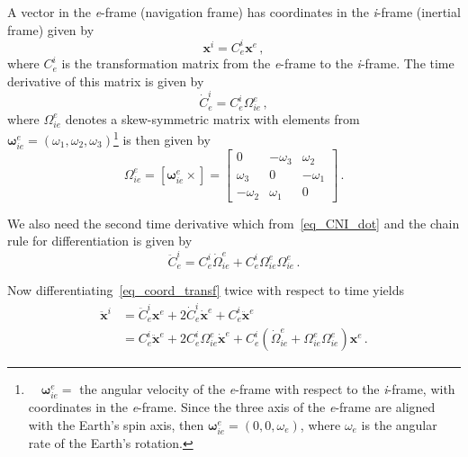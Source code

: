 \documentclass[journal]{IEEEtran}
\begin{document}
A vector in the \textit{e}-frame (navigation frame) has coordinates in the \textit{i}-frame (inertial frame) given by
\begin{equation}
    \boldsymbol{x}^i=C_{e}^{i}\boldsymbol{x}^e\,,
    \label{eq_coord_transf}
\end{equation}
where $C_{e}^{i}$ is the transformation matrix from the \textit{e}-frame to the \textit{i}-frame. The time derivative of this matrix is given by~\cite{jekeli2012inertial}
\begin{equation}
    {\dot{C}}_{e}^{i}=C_{e}^{i}{\Omega}_{ie}^{e}\,,
    \label{eq_CNI_dot}
\end{equation}
where ${\Omega}_{ie}^{e}$ denotes a skew-symmetric matrix with elements from $\boldsymbol{\omega}_{ie}^{e}=(\omega_1, \omega_2, \omega_3)$\footnote{$\quad \boldsymbol{\omega}_{ie}^{e}=$ the  angular velocity of the \textit{e}-frame with respect to the \textit{i}-frame, with coordinates in the \textit{e}-frame. Since the three axis of the \textit{e}-frame are aligned with the Earth's spin axis, then $\boldsymbol{\omega}_{ie}^{e}= (0, 0,  \omega_e)$, where $\omega_e$ is the angular rate of the Earth's rotation. } is then given by
\begin{equation}
    \Omega_{ie}^{e} = \left[ \boldsymbol{\omega}_{ie}^{e}\times\right]=\begin{bmatrix}
     0          & -\omega_3  & \omega_2\\
     \omega_3   & 0          & -\omega_1\\
     -\omega_2  & \omega_1   & 0
    \end{bmatrix}\,.
\end{equation}

We also need the second time derivative which from~\eqref{eq_CNI_dot} and the chain rule for differentiation is given by
\begin{equation}
     {\ddot{C}}_{e}^{i}=C_{e}^{i}{\dot{\Omega}}_{ie}^{e}+{C}_{e}^{i}{\Omega}_{ie}^{e}{\Omega}_{ie}^{e}\,.
\end{equation}

Now differentiating~\eqref{eq_coord_transf} twice with respect to time yields
\begin{equation}
    \begin{aligned}
        {\ddot{\boldsymbol{x}}}^{i}&= {\ddot{C}}_{e}^{i}{\boldsymbol{x}}^{e} + 2{\dot{C}}_{e}^{i}{\dot{\boldsymbol{x}}}^{e}+{{C}}_{e}^{i}{\ddot{\boldsymbol{x}}}^{e}\\
             &={{C}}_{e}^{i}{\ddot{\boldsymbol{x}}}^{e}+2{C}_{e}^{i}{\Omega}_{ie}^{e}{\dot{\boldsymbol{x}}}^{e} + {C}_{e}^{i}({\dot{\Omega}}_{ie}^{e}+{\Omega}_{ie}^{e}{\Omega}_{ie}^{e}){\boldsymbol{x}}^{e}\,.
    \end{aligned}
\end{equation}
\end{document}
